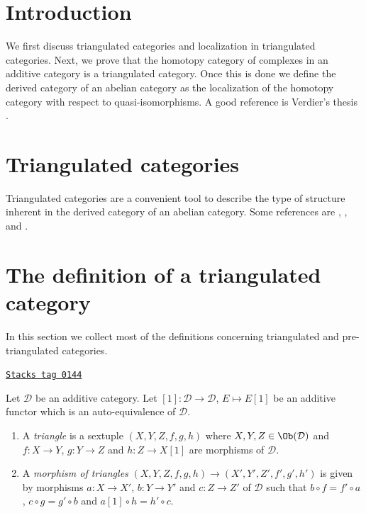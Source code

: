 \section{Introduction}
\label{derived-section-introduction}
We first discuss triangulated categories and localization in triangulated
categories. Next, we prove that the homotopy category of complexes in an
additive category is a triangulated category. Once this is done we define
the derived category of an abelian category as the localization of the
homotopy category with respect to quasi-isomorphisms.
A good reference is Verdier's thesis \cite{Verdier}.

\section{Triangulated categories}
\label{derived-section-triangulated-categories}
Triangulated categories are a convenient tool to describe the type
of structure inherent in the derived category of an abelian category.
Some references are \cite{Verdier}, \cite{KS}, and \cite{Neeman}.

\section{The definition of a triangulated category}
\label{derived-section-triangulated-definitions}
In this section we collect most of the definitions concerning triangulated
and pre-triangulated categories.

\begin{definition}[Triangle]
\label{derived-definition-triangle}
\href{https://stacks.math.columbia.edu/tag/0144}{\texttt{Stacks tag 0144}}

Let $\mathcal{D}$ be an additive category. Let
$[1] : \mathcal{D} \to \mathcal{D}$, $E \mapsto E[1]$
be an additive functor which is an auto-equivalence of $\mathcal{D}$.
\begin{enumerate}
\item A {\it triangle} is a sextuple
$(X, Y, Z, f, g, h)$ where $X, Y, Z \in \Ob(\mathcal{D})$ and
$f : X \to Y$, $g : Y \to Z$ and $h : Z \to X[1]$ are morphisms
of $\mathcal{D}$.
\item A {\it morphism of triangles}
$(X, Y, Z, f, g, h) \to (X', Y', Z', f', g', h')$
is given by morphisms $a : X \to X'$, $b : Y \to Y'$ and $c : Z \to Z'$
of $\mathcal{D}$ such that
$b \circ f = f' \circ a$, $c  \circ g = g' \circ b$ and
$a[1] \circ h = h' \circ c$.
\end{enumerate}
\end{definition}

